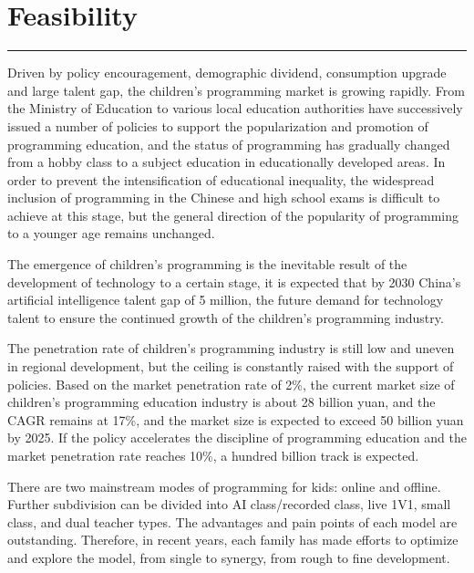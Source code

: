 \documentclass[12pt]{extarticle}
\numberwithin{figure}{section}
\begin{document}
\section{Feasibility}
\vspace{-0.1cm}
\hrule
\vspace{0.2cm}
Driven by policy encouragement, demographic dividend, consumption upgrade and large talent gap, the children's programming market is growing rapidly. From the Ministry of Education to various local education authorities have successively issued a number of policies to support the popularization and promotion of programming education, and the status of programming has gradually changed from a hobby class to a subject education in educationally developed areas. In order to prevent the intensification of educational inequality, the widespread inclusion of programming in the Chinese and high school exams is difficult to achieve at this stage, but the general direction of the popularity of programming to a younger age remains unchanged.

The emergence of children's programming is the inevitable result of the development of technology to a certain stage, it is expected that by 2030 China's artificial intelligence talent gap of 5 million, the future demand for technology talent to ensure the continued growth of the children's programming industry.

The penetration rate of children's programming industry is still low and uneven in regional development, but the ceiling is constantly raised with the support of policies. Based on the market penetration rate of 2\%, the current market size of children's programming education industry is about 28 billion yuan, and the CAGR remains at 17\%, and the market size is expected to exceed 50 billion yuan by 2025. If the policy accelerates the discipline of programming education and the market penetration rate reaches 10\%, a hundred billion track is expected.

There are two mainstream modes of programming for kids: online and offline. Further subdivision can be divided into AI class/recorded class, live 1V1, small class, and dual teacher types. The advantages and pain points of each model are outstanding. Therefore, in recent years, each family has made efforts to optimize and explore the model, from single to synergy, from rough to fine development.
\end{document}
